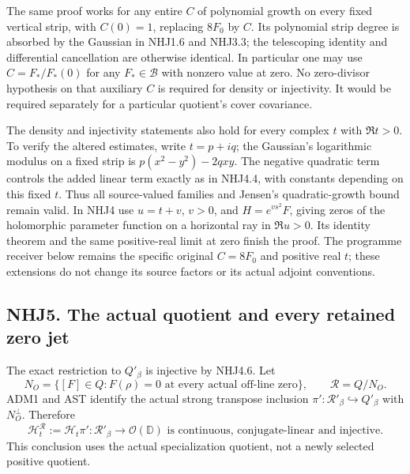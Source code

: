 The same proof works for any entire \(C\) of polynomial growth on every
fixed vertical strip, with \(C(0)=1\), replacing \(8F_0\) by \(C\). Its
polynomial strip degree is absorbed by the Gaussian in NHJ1.6 and
NHJ3.3; the telescoping identity and differential cancellation are
otherwise identical. In particular one may use \(C=F_*/F_*(0)\) for any
\(F_*\in\mathcal B\) with nonzero value at zero. No zero-divisor
hypothesis on that auxiliary \(C\) is required for density or
injectivity. It would be required separately for a particular quotient's
cover covariance.

The density and injectivity statements also hold for every complex \(t\)
with \(\Re t>0\). To verify the altered estimates, write \(t=p+iq\); the
Gaussian's logarithmic modulus on a fixed strip is \(p(x^2-y^2)-2qxy\).
The negative quadratic term controls the added linear term exactly as in
NHJ4.4, with constants depending on this fixed \(t\). Thus all
source-valued families and Jensen's quadratic-growth bound remain valid.
In NHJ4 use \(u=t+v\), \(v>0\), and \(H=e^{vs^2}F\), giving zeros of the
holomorphic parameter function on a horizontal ray in \(\Re u>0\). Its
identity theorem and the same positive-real limit at zero finish the
proof. The programme receiver below remains the specific original
\(C=8F_0\) and positive real \(t\); these extensions do not change its
source factors or its actual adjoint conventions.

\subsection{NHJ5. The actual quotient and every retained zero
jet}\label{nhj5.-the-actual-quotient-and-every-retained-zero-jet}

The exact restriction to \(Q'_\beta\) is injective by NHJ4.6. Let \[
N_O=\{[F]\in Q:F(\rho)=0\text{ at every actual off-line zero}\},
\qquad \mathcal R=Q/N_O.
\tag{NHJ5.1}
\] ADM1 and AST identify the actual strong transpose inclusion
\(\pi':\mathcal R'_\beta\hookrightarrow Q'_\beta\) with \(N_O^\perp\).
Therefore \[
\boxed{\mathcal H_t^{\mathcal R}:=\mathcal H_t\pi':
\mathcal R'_\beta\longrightarrow\mathcal O(\mathbb D)
\text{ is continuous, conjugate-linear and injective}.}
\tag{NHJ5.2}
\] This conclusion uses the actual specialization quotient, not a newly
selected positive quotient.

